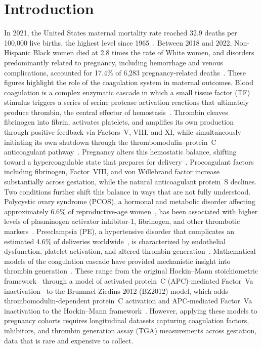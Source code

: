 \section{Introduction}
\label{sec:intro}

In 2021, the United States maternal mortality rate reached 32.9 deaths per 100,000
live births, the highest level since 1965~\citep{Toy2023WSJ,Harris2023}. Between 2018 and 2022,
Non-Hispanic Black women died at 2.8 times the rate of White women, and
disorders predominantly related to pregnancy, including hemorrhage and venous
complications, accounted for 17.4\% of 6{,}283 pregnancy-related deaths~\citep{Chen2025}. These figures
highlight the role of the coagulation system in maternal outcomes. Blood coagulation is a complex enzymatic cascade in which a small
tissue factor (TF) stimulus triggers a series of serine protease activation reactions
that ultimately produce thrombin, the central effector of
hemostasis~\citep{Mann2011,Butenas2009}. Thrombin cleaves fibrinogen into fibrin,
activates platelets, and amplifies its own production through positive feedback via
Factors~V, VIII, and XI, while simultaneously initiating its own shutdown through the
thrombomodulin--protein~C anticoagulant pathway~\citep{Mann2011}. Pregnancy
alters this hemostatic balance, shifting toward a hypercoagulable state
that prepares for delivery~\citep{Hellgren2003,Grouzi2022,Bremme2003}.
Procoagulant factors including fibrinogen, Factor~VIII, and von Willebrand factor
increase substantially across gestation, while the natural anticoagulant protein~S
declines. Two conditions further shift this balance in ways that are not fully understood.
Polycystic ovary syndrome (PCOS), a hormonal and metabolic disorder affecting
approximately 6.6\% of reproductive-age women~\citep{Azziz2004}, has been associated with
higher levels of plasminogen activator inhibitor-1, fibrinogen, and other thrombotic
markers~\citep{Palomba2015}. Preeclampsia (PE), a hypertensive
disorder that complicates an estimated 4.6\% of deliveries worldwide~\citep{Abalos2013}, is
characterized by endothelial dysfunction, platelet activation, and altered thrombin
generation~\citep{Dusse2011}. Mathematical models of the coagulation cascade have provided mechanistic insight
into thrombin generation~\citep{Luan2007,Luan2010}. These range
from the original Hockin--Mann stoichiometric framework~\citep{Hockin2002} through
a model of activated protein~C (APC)-mediated Factor~Va inactivation~\citep{Bravo2012}
to the Brummel-Ziedins 2012 (BZ2012) model, which adds thrombomodulin-dependent protein~C
activation and APC-mediated Factor~Va inactivation to the Hockin--Mann
framework~\citep{BrummelZiedins2012}. However, applying these models to pregnancy
cohorts requires longitudinal datasets capturing coagulation factors, inhibitors,
and thrombin generation assay (TGA) measurements across gestation, data that is
rare and expensive to collect.

